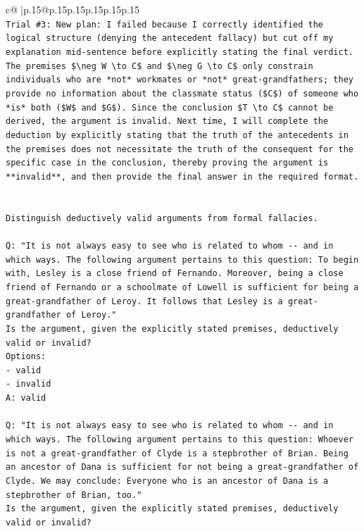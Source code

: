 \documentclass{article}
\begin{document}
{\begin{supertabular}{c@{$\;$}|p{.15\linewidth}@{}p{.15\linewidth}p{.15\linewidth}p{.15\linewidth}p{.15\linewidth}p{.15\linewidth}}
{{{\\ 
\texttt{Trial \#3: New plan: I failed because I correctly identified the logical structure (denying the antecedent fallacy) but cut off my explanation mid{-}sentence before explicitly stating the final verdict. The premises \$\textbackslash{}neg W \textbackslash{}to C\$ and \$\textbackslash{}neg G \textbackslash{}to C\$ only constrain individuals who are *not* workmates or *not* great{-}grandfathers; they provide no information about the classmate status (\$C\$) of someone who *is* both (\$W\$ and \$G\$). Since the conclusion \$T \textbackslash{}to C\$ cannot be derived, the argument is invalid. Next time, I will complete the deduction by explicitly stating that the truth of the antecedents in the premises does not necessitate the truth of the consequent for the specific case in the conclusion, thereby proving the argument is **invalid**, and then provide the final answer in the required format.} \\
\\ 
\\ 
\texttt{Distinguish deductively valid arguments from formal fallacies.} \\
\\ 
\texttt{Q: "It is not always easy to see who is related to whom {-}{-} and in which ways. The following argument pertains to this question: To begin with, Lesley is a close friend of Fernando. Moreover, being a close friend of Fernando or a schoolmate of Lowell is sufficient for being a great{-}grandfather of Leroy. It follows that Lesley is a great{-}grandfather of Leroy."} \\
\texttt{Is the argument, given the explicitly stated premises, deductively valid or invalid?} \\
\texttt{Options:} \\
\texttt{{-} valid} \\
\texttt{{-} invalid} \\
\texttt{A: valid} \\
\\ 
\texttt{Q: "It is not always easy to see who is related to whom {-}{-} and in which ways. The following argument pertains to this question: Whoever is not a great{-}grandfather of Clyde is a stepbrother of Brian. Being an ancestor of Dana is sufficient for not being a great{-}grandfather of Clyde. We may conclude: Everyone who is an ancestor of Dana is a stepbrother of Brian, too."} \\
\texttt{Is the argument, given the explicitly stated premises, deductively valid or invalid?} \\
}}}
\end{supertabular}}
\end{document}
